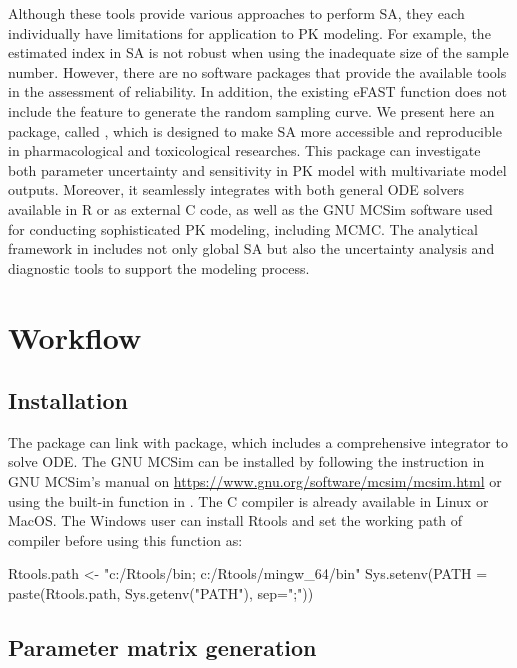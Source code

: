 Although these tools provide various approaches to perform SA, they each
individually have limitations for application to PK modeling. For
example, the estimated index in SA is not robust when using the
inadequate size of the sample number. However, there are no software
packages that provide the available tools in the assessment of
reliability. In addition, the existing eFAST function does not include
the feature to generate the random sampling curve. We present here an
package, called , which is designed to make SA more
accessible and reproducible in pharmacological and toxicological
researches. This package can investigate both parameter uncertainty and
sensitivity in PK model with multivariate model outputs. Moreover, it
seamlessly integrates with both general ODE solvers available in R or as
external C code, as well as the GNU MCSim software used for conducting
sophisticated PK modeling, including MCMC. The analytical framework in
 includes not only global SA but also the uncertainty
analysis and diagnostic tools to support the modeling process.

\hypertarget{workflow}{%
\section{Workflow}\label{workflow}}

\hypertarget{installation}{%
\subsection{Installation}\label{installation}}

The  package can link with  package,
which includes a comprehensive integrator to solve ODE. The GNU MCSim
can be installed by following the instruction in GNU MCSim's manual on
\url{https://www.gnu.org/software/mcsim/mcsim.html} or using the
built-in function  in . The C
compiler is already available in Linux or MacOS. The Windows user can
install Rtools and set the working path of compiler before using this
function as:

\begin{Schunk}
\begin{Sinput}
Rtools.path <- "c:/Rtools/bin; c:/Rtools/mingw_64/bin"
Sys.setenv(PATH = paste(Rtools.path, Sys.getenv("PATH"), sep=";"))
\end{Sinput}
\end{Schunk}

\hypertarget{parameter-matrix-generation}{%
\subsection{Parameter matrix
generation}\label{parameter-matrix-generation}}

